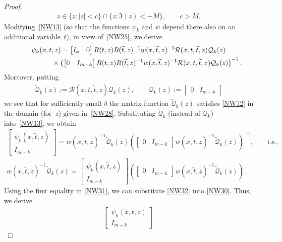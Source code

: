 \documentclass[11pt]{article}
\def\wt{\widetilde}
\newcommand{\cQ}{{\mathcal Q}}
\newcommand{\cR}{{\mathcal R}}
\numberwithin{equation}{section}
\begin{document}
\begin{proof}
\begin{gather}
 z \in \{z \colon |z|<c\}\cap \{z \colon \Im(z)<-M\}, \qquad\! c>M .
\end{gather}
Modifying~\eqref{NW13} (so that the functions $\psi_k$ and $w$ depend there also on an additional variable~$t$),
in view of~\eqref{NW25},
we derive
\begin{gather}\nonumber
  \psi_k (x,t,z)
= \begin{bmatrix}I_k &0 \end{bmatrix}
R(t,z)R(\wt t,z)^{-1}w(x,\wt t,z)^{-1}\cR(x,t, \wt t,z)
 \cQ_k (z)
\\
\hphantom{\psi_k (x,t,z)=}{} \times \left(
  \begin{bmatrix}0 &I_{m-k} \end{bmatrix}
 R(t,z)R(\wt t,z)^{-1}w(x,\wt t,z)^{-1}\cR(x,t, \wt t,z)
  \cQ_k(z)
 \right)^{-1}.
 \label{NW30}
\end{gather}
Moreover, putting
\begin{gather} \label{NW31}
\wt \cQ_k(z):=\cR(x,t, \wt t,z)\cQ_k(z), \qquad \cQ_k(z):=\begin{bmatrix} 0 & I_{m-k}\end{bmatrix}
\end{gather}
we see that for suf\/f\/iciently small $\delta$ the matrix function $\wt \cQ_k(z)$ satisf\/ies \eqref{NW12} in the domain (for~$z$)
given in~\eqref{NW28}. Substituting $\wt \cQ_k$ (instead of $ \cQ_k$) into~\eqref{NW13}, we obtain
\begin{gather} \nonumber
\begin{bmatrix}\psi_k(x, \wt t,z) \\ I_{m-k} \end{bmatrix}=w(x,\wt t,z)^{-1}\wt \cQ_k(z)\left(
  \begin{bmatrix}0 &I_{m-k} \end{bmatrix}
 w(x,\wt t,z)^{-1}
  \wt \cQ_k(z)
 \right)^{-1}, \qquad {\mathrm{i.e.,}}
\\ \label{NW32}
w(x,\wt t,z)^{-1}\wt \cQ_k(z)=\begin{bmatrix}\psi_k(x, \wt t,z) \\ I_{m-k} \end{bmatrix}\left(
  \begin{bmatrix}0 &I_{m-k} \end{bmatrix}
 w(x,\wt t,z)^{-1}
  \wt \cQ_k(z)
 \right).
\end{gather}
Using the f\/irst equality in \eqref{NW31}, we can substitute \eqref{NW32} into \eqref{NW30}.
Thus, we derive
\begin{gather*}
\begin{bmatrix} \psi_k(x, t,z) \\ I_{m-k} \end{bmatrix}

\end{gather*}
\end{proof}
\end{document}
